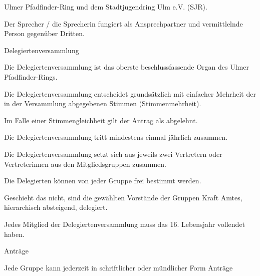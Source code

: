 \begin{legal}
\begin{legal}
                  Ulmer Pfadfinder-Ring und dem Stadtjugendring Ulm e.V. (SJR).
            \item Der Sprecher / die Sprecherin fungiert als Ansprechpartner und vermittlelnde 
                  Person gegenüber Dritten.
        \end{legal}
    \item Delegiertenversammlung
        \begin{legal}
            \item Die Delegiertenversammlung ist das oberste beschlussfassende Organ
                  des Ulmer Pfadfinder-Rings.
            \item Die Delegiertenversammlung entscheidet grundsätzlich mit einfacher Mehrheit der 
                  in der Versammlung abgegebenen Stimmen (Stimmenmehrheit).
            \item Im Falle einer Stimmengleichheit gilt der Antrag als abgelehnt.
            \item Die Delegiertenversammlung tritt mindestens einmal jährlich zusammen.
            \item Die Delegiertenversammlung setzt sich aus jeweils zwei Vertretern oder 
                  Vertreterinnen aus den Mitgliedsgruppen zusammen.
                \begin{legal}
                    \item Die Delegierten können von jeder Gruppe frei bestimmt werden.
                    \item Geschieht das nicht, sind die gewählten Vorstände der Gruppen Kraft Amtes, 
                          hierarchisch absteigend, delegiert.
                \end{legal}
            \item Jedes Mitglied der Delegiertenversammlung muss das 16. Lebensjahr vollendet haben.
            \item Anträge
                \begin{legal}
                    \item Jede Gruppe kann jederzeit in schriftlicher oder mündlicher Form Anträge 

\end{legal}
\end{legal}
\end{legal}
